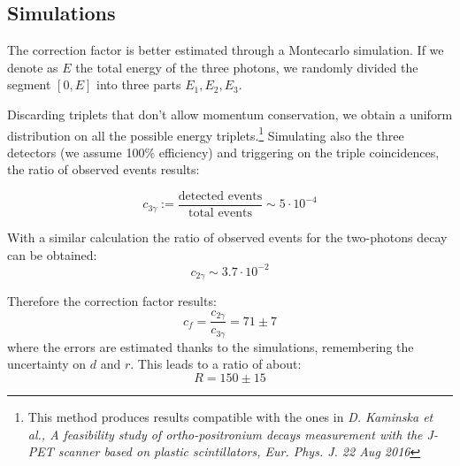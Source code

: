\documentclass[main.tex]{subfiles}
\begin{document}
\subsection{Simulations}

The correction factor is better estimated through a Montecarlo simulation. If we denote as $E$ the total energy of the three photons, we randomly divided the segment $[0,E]$ into three parts $E_1,E_2,E_3$.


%
%
%

Discarding triplets that don't allow momentum conservation, we obtain a uniform distribution on all the possible energy triplets.\footnote{This method produces results compatible with the ones in \emph{D. Kaminska et al., A feasibility study of ortho-positronium decays measurement with the
J-PET scanner based on plastic scintillators, Eur. Phys. J. 22 Aug 2016}}
Simulating also the three detectors (we assume 100\% efficiency) and triggering on the triple coincidences, the ratio of observed events results:

\begin{equation*}
  c_{3\gamma} := \frac{\text{detected events}}{\text{total events}} \sim 5\cdot10^{-4}
\end{equation*}

With a similar calculation the ratio of observed events for the two-photons decay can be obtained:
\begin{equation*}
  c_{2\gamma} \sim 3.7\cdot10^{-2}
\end{equation*}

Therefore the correction factor results:
\begin{equation}
  c_f = \frac{c_{2\gamma}}{c_{3\gamma}} = 71\pm7
\end{equation}
where the errors are estimated thanks to the simulations, remembering the uncertainty on $d$ and $r$.
This leads to a ratio of about:
\begin{equation}
  R = 150 \pm 15
\end{equation}
\end{document}
